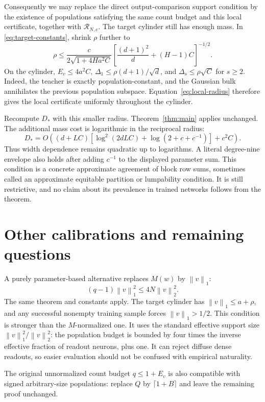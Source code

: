 \documentclass[11pt]{article}
\newcommand{\norm}[1]{\left\|#1\right\|}
\begin{document}
Consequently we may replace the direct output-comparison support condition
by the existence of populations satisfying the same count budget and this
local certificate, together with $\mathcal R_{N,c}$. The target cylinder
still has enough mass. In \eqref{eq:target-constants}, shrink $\rho$ further
to
\begin{equation}\label{eq:local-radius}
 \rho\le\frac{c}{2\sqrt{1+4Ha^2C}}
 \left[\frac{(d+1)^2}{d}+(H-1)C\right]^{-1/2}.
\end{equation}
On the cylinder, $E_v\le4a^2C$,
$\Delta_1\le\rho(d+1)/\sqrt d$, and
$\Delta_s\le\rho\sqrt C$ for $s\ge2$. Indeed, the teacher is exactly
population-constant, and the Gaussian bulk annihilates the previous
population subspace. Equation~\eqref{eq:local-radius} therefore gives the
local certificate uniformly throughout the cylinder.

Recompute $D_*$ with this smaller radius. Theorem~\ref{thm:main} applies
unchanged. The additional mass cost is logarithmic in the reciprocal radius:
\[
 D_*=O\left((d+LC)[\log^2(2dLC)+\log(2+c+c^{-1})]+c^2C\right).
\]
Thus width dependence remains quadratic up to logarithms. A literal degree-nine
envelope also holds after adding $c^{-1}$ to the displayed parameter sum.
This condition is a concrete approximate agreement of block row sums,
sometimes called an approximate equitable partition or lumpability
condition. It is still restrictive, and no claim about its prevalence in
trained networks follows from the theorem.

\section{Other calibrations and remaining questions}

A purely parameter-based alternative replaces $M(w)$ by $\norm v_1$:
\[
 (q-1)\norm v_1^2\le4N\norm v_2^2.
\]
The same theorem and constants apply. The target cylinder has
$\norm v_1\le a+\rho$, and any successful nonempty training sample forces
$\norm v_1>1/2$. This condition is stronger than the $M$-normalized one.
It uses the standard effective support size
$\norm v_1^2/\norm v_2^2$: the population budget is bounded by four times
the inverse effective fraction of readout neurons, plus one. It can reject
diffuse dense readouts, so easier evaluation should not be confused with
empirical naturality.

The original unnormalized count budget $q\le1+E_v$ is also compatible with
signed arbitrary-size populations: replace $Q$ by $\lceil1+B\rceil$ and
leave the remaining proof unchanged.
\end{document}
